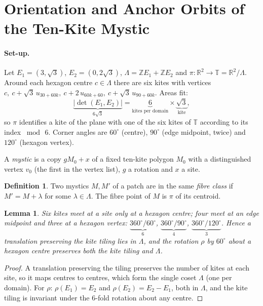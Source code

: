 \documentclass[11pt,a4paper]{article}
\newcommand{\ZZ}{\mathbb{Z}}
\newcommand{\RR}{\mathbb{R}}
\newcommand{\TT}{\mathbb{T}}
\newcommand{\Lam}{\Lambda}
\theoremstyle{plain}
\newtheorem{lemma}{Lemma}
\theoremstyle{definition}
\newtheorem{definition}{Definition}
\begin{document}

\section{Orientation and Anchor Orbits of the Ten-Kite Mystic}
\label{sec:mystic}

\paragraph{Set-up.} Let $E_1=(3,\sqrt3)$, $E_2=(0,2\sqrt3)$, $\Lam=\ZZ E_1+\ZZ E_2$
and $\pi:\RR^2\to\TT=\RR^2/\Lam$. Around each hexagon centre $c\in\Lam$ there are
six kites with vertices $c,\ c+\sqrt3\,u_{30+60k},\ c+2\,u_{60k+60},\
c+\sqrt3\,u_{90+60k}$. Areas fit:
\begin{equation}
  \underbrace{|\det(E_1,E_2)|}_{6\sqrt3}=\underbrace{6}_{\text{kites per domain}}
  \times\underbrace{\sqrt3}_{\text{kite}},
\end{equation}
so $\pi$ identifies a kite of the plane with one of the six kites of $\TT$
according to its index $\bmod\,6$. Corner angles are $60^\circ$ (centre),
$90^\circ$ (edge midpoint, twice) and $120^\circ$ (hexagon vertex).

A \emph{mystic} is a copy $gM_0+x$ of a fixed ten-kite polygon $M_0$ with a
distinguished vertex $v_0$ (the first in the vertex list), $g$ a rotation and $x$
a site.

\begin{definition}
Two mystics $M,M'$ of a patch are in the same \emph{fibre class} if $M'=M+\lambda$
for some $\lambda\in\Lam$. The fibre point of $M$ is $\pi$ of its centroid.
\end{definition}

\begin{lemma}
\label{lem:six}
Six kites meet at a site only at a hexagon centre; four meet at an edge midpoint
and three at a hexagon vertex:
$\underbrace{360^\circ/60^\circ}_{6}$, $\underbrace{360^\circ/90^\circ}_{4}$,
$\underbrace{360^\circ/120^\circ}_{3}$. Hence a translation preserving the kite
tiling lies in $\Lam$, and the rotation $\rho$ by $60^\circ$ about a hexagon
centre preserves both the kite tiling and $\Lam$.
\end{lemma}
\begin{proof}
A translation preserving the tiling preserves the number of kites at each site,
so it maps centres to centres, which form the single coset $\Lam$ (one per
domain). For $\rho$: $\rho(E_1)=E_2$ and $\rho(E_2)=E_2-E_1$, both in $\Lam$, and
the kite tiling is invariant under the $6$-fold rotation about any centre.
\end{proof}
\end{document}
